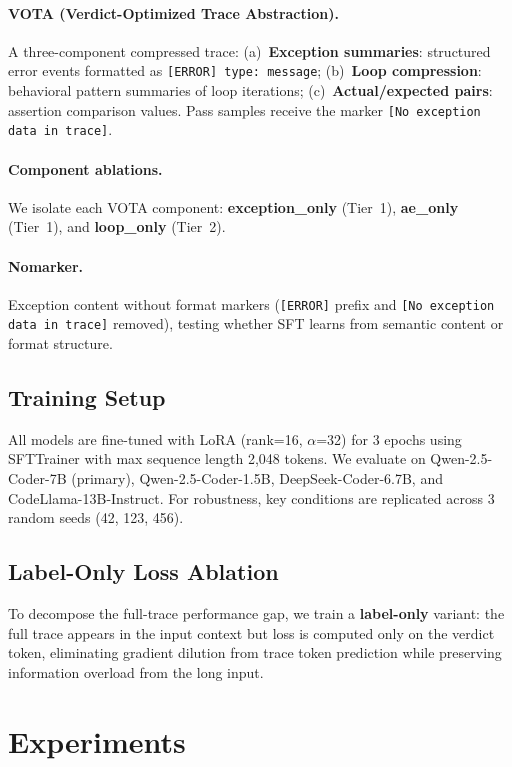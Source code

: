 \documentclass[11pt]{article}
\begin{document}
\paragraph{VOTA (Verdict-Optimized Trace Abstraction).} A three-component compressed trace: (a)~\textbf{Exception summaries}: structured error events formatted as \texttt{[ERROR] type: message}; (b)~\textbf{Loop compression}: behavioral pattern summaries of loop iterations; (c)~\textbf{Actual/expected pairs}: assertion comparison values. Pass samples receive the marker \texttt{[No exception data in trace]}.

\paragraph{Component ablations.} We isolate each VOTA component: \textbf{exception\_only} (Tier~1), \textbf{ae\_only} (Tier~1), and \textbf{loop\_only} (Tier~2).

\paragraph{Nomarker.} Exception content without format markers (\texttt{[ERROR]} prefix and \texttt{[No exception data in trace]} removed), testing whether SFT learns from semantic content or format structure.

\subsection{Training Setup}

All models are fine-tuned with LoRA (rank=16, $\alpha$=32) for 3 epochs using SFTTrainer with max sequence length 2,048 tokens. We evaluate on Qwen-2.5-Coder-7B (primary), Qwen-2.5-Coder-1.5B, DeepSeek-Coder-6.7B, and CodeLlama-13B-Instruct. For robustness, key conditions are replicated across 3 random seeds (42, 123, 456).

\subsection{Label-Only Loss Ablation}

To decompose the full-trace performance gap, we train a \textbf{label-only} variant: the full trace appears in the input context but loss is computed only on the verdict token, eliminating gradient dilution from trace token prediction while preserving information overload from the long input.

\section{Experiments}
\end{document}
